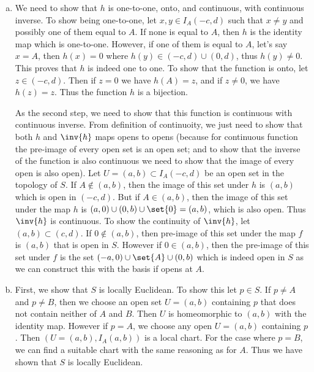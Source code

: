 \begin{solution}
	\begin{enumerate}[(a)]
		\item We need to show that $ h $ is one-to-one, onto, and continuous, with continuous inverse. To show being one-to-one, let $ x,y \in I_A(-c,d) $ such that $ x\neq y $ and possibly one of them equal to $ A $. If none is equal to $ A $, then $ h $ is the identity map which is one-to-one. However, if one of them is equal to $ A $, let's say $ x = A $, then $ h(x) = 0 $ where $ h(y) \in (-c,d)\cup(0,d)$, thus $ h(y) \neq 0 $. This proves that $ h $ is indeed one to one. To show that the function is onto, let $ z \in (-c,d) $. Then if $ z = 0 $ we have $ h(A) = z $, and if $ z \neq 0 $, we have $ h(z) = z $. Thus the function $ h $ is a bijection.
		
		As the second step, we need to show that this function is continuous with continuous inverse. From definition of continuoity, we just need to show that both $ h $ and $ \inv{h} $ maps opens to opens (because for continuous function the pre-image of every open set is an open set; and to show that the inverse of the function is also continuous we need to show that the image of every open is also open).
		Let $ U = (a,b) \subset I_A(-c,d) $ be an open set in the topology of $ S $. If $ A \notin (a,b) $, then the image of this set under $ h $ is $ (a,b) $ which is open in $ (-c,d) $. But if $ A \in (a,b) $, then the image of this set under the map $ h $ is $ (a,0)\cup(0,b)\cup\set{0} = (a,b) $, which is also open. Thus $ \inv{h} $ is continuous. To show the continuity of $ \inv{h} $, let $ (a,b) \subset (c,d) $. If $ 0 \notin (a,b) $, then pre-image of this set under the map $ f $ is $ (a,b) $ that is open in $ S $. However if $ 0 \in (a,b) $, then the pre-image of this set under $ f $ is the set $ (-a,0) \cup \set{A} \cup (0,b) $ which is indeed open in $ S $ as we can construct this with the basis if opens at $ A $.
		
		\item First, we show that $ S $ is locally Euclidean. To show this let $ p \in S $. If $ p \neq A $ and $ p \neq B $, then we choose an open set $ U =  (a,b) $ containing $ p $ that does not contain neither of $ A $ and  $ B $. Then $ U $ is homeomorphic to $ (a,b) $ with the identity map. However if $ p = A $, we choose any open $ U = (a,b) $ containing $ p $. Then $ (U = (a,b),I_A(a,b)) $ is a local chart. For the case where $ p = B $, we can find a suitable chart with the same reasoning as for $ A $. Thus we have shown that $ S $ is locally Euclidean.
		

\end{enumerate}
\end{solution}
